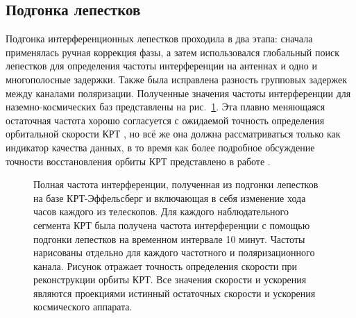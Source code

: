 \subsection{Подгонка лепестков}

Подгонка интерференционных лепестков проходила в два этапа: сначала применялась ручная коррекция
фазы, а затем использовался глобальный поиск лепестков для определения частоты интерференции на
антеннах и одно и многополосные задержки. Также была исправлена разность групповых задержек между
каналами поляризации. Полученные значения частоты интерференции для наземно-космических баз
представлены на рис.~\ref{fig:0642_rate}. Эта плавно меняющаяся остаточная частота
хорошо согласуется с ожидаемой точность определения орбитальной скорости КРТ
\cite{Kardashev_2013_rus}, но всё же она должна
рассматриваться только как индикатор качества данных, в то время как более подробное обсуждение
точности восстановления орбиты КРТ представлено в работе \cite{Duev_2015}.

\begin{figure}[]
 \caption{Полная частота интерференции, полученная из подгонки лепестков на базе КРТ-Эффельсберг и
включающая в себя изменение хода часов каждого из телескопов. Для каждого наблюдательного сегмента
КРТ была получена частота интерференции с помощью подгонки лепестков на временном интервале 10
минут. Частоты нарисованы отдельно для каждого частотного и поляризационного канала. Рисунок
отражает точность определения скорости при реконструкции орбиты КРТ. Все значения скорости и
ускорения являются проекциями истинный остаточных скорости и ускорения космического аппарата.}
 \label{fig:0642_rate}
\end{figure}


